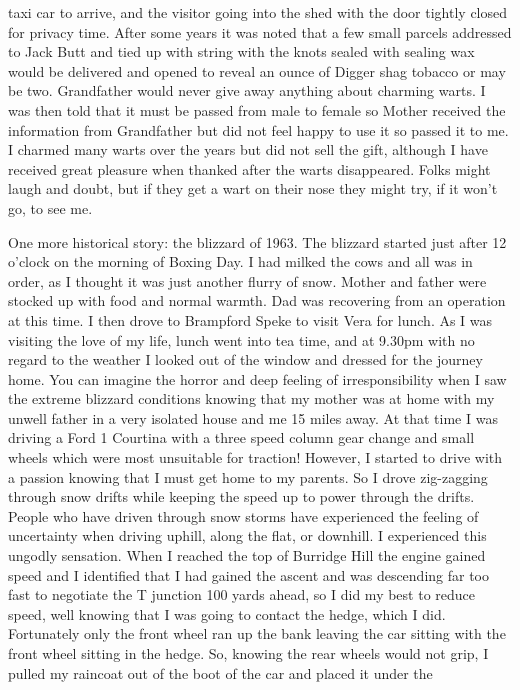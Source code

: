 taxi car to arrive, and the visitor going into the shed with the door tightly
closed for privacy time. After some years it was noted that a few small
parcels addressed to Jack Butt and tied up with string with the knots sealed
with sealing wax would be delivered and opened to reveal an ounce of Digger
shag tobacco or may be two. Grandfather would never give away anything about
charming warts. I was then told that it must be passed from male to female so
Mother received the information from Grandfather but did not feel happy to use
it so passed it to me. I charmed many warts over the years but did not sell
the gift, although I have received great pleasure when thanked after the warts
disappeared. Folks might laugh and doubt, but if they get a wart on their nose
they might try, if it won't go, to see me.

One more historical story: the blizzard of 1963. The blizzard started just after
12 o'clock on the morning of Boxing Day. I had milked the cows and all was in
order, as I thought it was just another flurry of snow. Mother and father were
stocked up with food and normal warmth. Dad was recovering from an operation at
this time. I then drove to Brampford Speke to visit Vera for lunch. As I was
visiting the love of my life, lunch went into tea time, and at 9.30pm with no
regard to the weather I looked out of the window and dressed for the journey
home. You can imagine the horror and deep feeling of irresponsibility when I
saw the extreme blizzard conditions knowing that my mother was at home with my
unwell father in a very isolated house and me 15 miles away. At that time I was
driving a Ford 1 Courtina with a three speed column gear change and small
wheels which were most unsuitable for traction! However, I started to drive
with a passion knowing that I must get home to my parents. So I drove
zig-zagging through snow drifts while keeping the speed up to power through the
drifts. People who have driven through snow storms have experienced the feeling
of uncertainty when driving uphill, along the flat, or downhill. I experienced
this ungodly sensation. When I reached the top of Burridge Hill the engine
gained speed and I identified that I had gained the ascent and was descending
far too fast to negotiate the T junction 100 yards ahead, so I did my best to
reduce speed, well knowing that I was going to contact the hedge, which I did.
Fortunately only the front wheel ran up the bank leaving the car sitting with
the front wheel sitting in the hedge. So, knowing the rear wheels would not
grip, I pulled my raincoat out of the boot of the car and placed it under the
